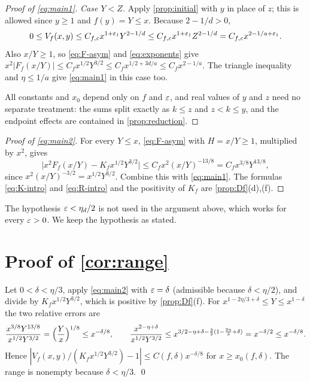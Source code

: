 \begin{proof}[Proof of \eqref{eq:main1}]
\emph{Case $Y<Z$.} Apply \cref{prop:initial} with $y$ in place of $z$; this is allowed since $y\ge1$ and $f(y)=Y\le x$. Because $2-1/d>0$,
\[
0\le V_f(x,y)\le C_{f,\varepsilon}x^{1+\varepsilon_1}Y^{2-1/d}\le C_{f,\varepsilon}x^{1+\varepsilon_1}Z^{2-1/d}=C_{f,\varepsilon}x^{2-1/a+\varepsilon_1}.
\]
Also $x/Y\ge1$, so \eqref{eq:F-asym} and \eqref{eq:exponents} give $x^2|F_f(x/Y)|\le C_fx^{1/2}Y^{3/2}\le C_fx^{1/2+3d/a}\le C_fx^{2-1/a}$. The triangle inequality and $\eta\le1/a$ give \eqref{eq:main1} in this case too.

All constants and $x_0$ depend only on $f$ and $\varepsilon$, and real values of $y$ and $z$ need no separate treatment: the sums split exactly as $k\le z$ and $z<k\le y$, and the endpoint effects are contained in \cref{prop:reduction}.
\end{proof}

\begin{proof}[Proof of \eqref{eq:main2}]
For every $Y\le x$, \eqref{eq:F-asym} with $H=x/Y\ge1$, multiplied by $x^2$, gives
\[
\bigl|x^2F_f(x/Y)-K_fx^{1/2}Y^{3/2}\bigr|\le C_fx^2(x/Y)^{-13/8}=C_fx^{3/8}Y^{13/8},
\]
since $x^2(x/Y)^{-3/2}=x^{1/2}Y^{3/2}$. Combine this with \eqref{eq:main1}. The formulas \eqref{eq:K-intro} and \eqref{eq:R-intro} and the positivity of $K_f$ are \cref{prop:Df}(d),(f).
\end{proof}

\begin{remark}
The hypothesis $\varepsilon<\eta_d/2$ is not used in the argument above, which works for every $\varepsilon>0$. We keep the hypothesis as stated.
\end{remark}

\section{\texorpdfstring{Proof of \cref{cor:range}}{Proof of Corollary 1.2}}\label{sec:corollary}

Let $0<\delta<\eta/3$, apply \eqref{eq:main2} with $\varepsilon=\delta$ (admissible because $\delta<\eta/2$), and divide by $K_fx^{1/2}Y^{3/2}$, which is positive by \cref{prop:Df}(f). For $x^{1-2\eta/3+\delta}\le Y\le x^{1-\delta}$ the two relative errors are
\[
\frac{x^{3/8}Y^{13/8}}{x^{1/2}Y^{3/2}}=\Bigl(\frac Yx\Bigr)^{1/8}\le x^{-\delta/8},\qquad
\frac{x^{2-\eta+\delta}}{x^{1/2}Y^{3/2}}\le x^{3/2-\eta+\delta-\frac32(1-\frac{2\eta}3+\delta)}=x^{-\delta/2}\le x^{-\delta/8}.
\]
Hence $|V_f(x,y)/(K_fx^{1/2}Y^{3/2})-1|\le C(f,\delta)x^{-\delta/8}$ for $x\ge x_0(f,\delta)$. The range is nonempty because $\delta<\eta/3$. \qed

